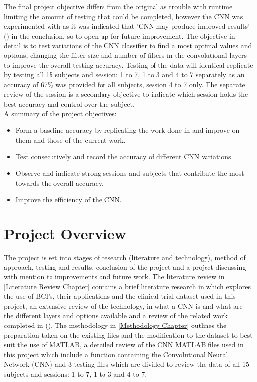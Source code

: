The final project objective differs from the original as trouble with runtime limiting the amount of testing that could be completed, however the CNN was experimented with as it was indicated that 'CNN may produce improved results' (\cite{PalaniPaper}) in the conclusion, so to open up for future improvement. The objective in detail is to test variations of the CNN classifier to find a most optimal values and options, changing the filter size and number of filters in the convolutional layers to improve the overall testing accuracy. Testing of the data will identical replicate \cite{PalaniPaper} by testing all 15 subjects and session: 1 to 7, 1 to 3 and 4 to 7 separately as an accuracy of 67\% was provided for all subjects, session 4 to 7 only. The separate review of the session is a secondary objective to indicate which session holds the best accuracy and control over the subject.\\

A summary of the project objectives:

\begin{itemize}
  \item Form a baseline accuracy by replicating the work done in \cite{PalaniPaper} and improve on them and those of the current work.
  \item Test consecutively and record the accuracy of different CNN variations.
  \item Observe and indicate strong sessions and subjects that contribute the most towards the overall accuracy.
  \item Improve the efficiency of the CNN.
\end{itemize}

\section{Project Overview}
\label{Project Overview Section}

The project is set into stages of research (literature and technology), method of approach, testing and results, conclusion of the project and a project discussing with mention to improvements and future work. The literature review in \cref{Literature Review Chapter} contains a brief literature research in which explores the use of BCI's, their applications and the clinical trial dataset used in this project, an extensive review of the technology, in what a CNN is and what are the different layers and options available and a review of the related work completed in (\cite{PalaniPaper}). The methodology in \cref{Methodology Chapter} outlines the preparation taken on the existing files and the modification to the dataset to best suit the use of MATLAB, a detailed review of the CNN MATLAB files used in this project which include a function containing the Convolutional Neural Network (CNN) and 3 testing files which are divided to review the data of all 15 subjects and sessions: 1 to 7, 1 to 3 and 4 to 7. \\


